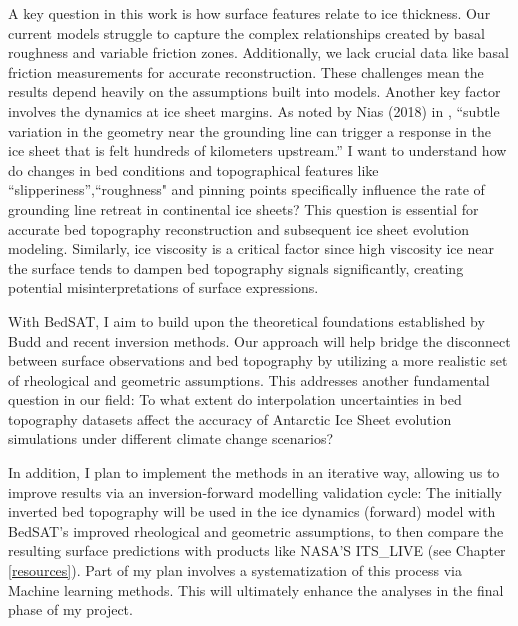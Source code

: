 A key question in this work is how surface features relate to ice thickness. Our current models struggle to capture the complex relationships created by basal roughness and variable friction zones. Additionally, we lack crucial data like basal friction measurements for accurate reconstruction. These challenges mean the results depend heavily on the assumptions built into models. Another key factor involves the dynamics at ice sheet margins. As noted by Nias (2018) in \cite{Nias_2018}, ``subtle variation in the geometry near the grounding line can trigger a response in the ice sheet that is felt hundreds of kilometers upstream.''
I want to understand how do changes in bed conditions and topographical features like ``slipperiness'',``roughness" and pinning points specifically influence the rate of grounding line retreat in continental ice sheets? This question is essential for accurate bed topography reconstruction and subsequent ice sheet evolution modeling. Similarly, ice viscosity is a critical factor since high viscosity ice near the surface tends to dampen bed topography signals significantly\cite{deRydt_2013}, creating potential misinterpretations of surface expressions. 

With BedSAT, I aim to build upon the theoretical foundations established by Budd and recent inversion methods. Our approach will help bridge the disconnect between surface observations and bed topography by utilizing a more realistic set of rheological and geometric assumptions.  This addresses another fundamental question in our field: To what extent do interpolation uncertainties in bed topography datasets affect the accuracy of Antarctic Ice Sheet evolution simulations under different climate change scenarios?

In addition, I plan to implement the methods in an iterative way, allowing us to improve results via an inversion-forward modelling validation cycle: The initially inverted bed topography will be used in the ice dynamics (forward) model with BedSAT's improved rheological and geometric assumptions, to then compare the resulting surface predictions with products like NASA'S ITS\_LIVE (see Chapter \ref{resources}). Part of my plan involves a systematization of this process via Machine learning methods. This will ultimately enhance the analyses in the final phase of my project.
